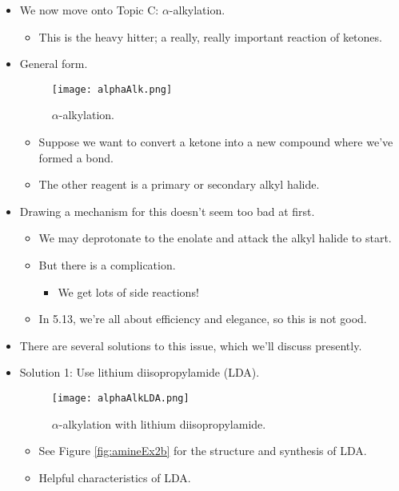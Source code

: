 \documentclass[../notes.tex]{subfiles}
\begin{document}
\begin{itemize}
    \pagebreak
    \item We now move onto Topic C: $\alpha$-alkylation.
    \begin{itemize}
        \item This is the heavy hitter; a really, really important reaction of ketones.
    \end{itemize}
    \item General form.
    \begin{figure}[h!]
        \centering
        \texttt{[image: alphaAlk.png]}
        \caption{$\alpha$-alkylation.}
        \label{fig:alphaAlk}
    \end{figure}
    \begin{itemize}
        \item Suppose we want to convert a ketone into a new compound where we've formed a  bond.
        \item The other reagent is a primary or secondary alkyl halide.
    \end{itemize}
    \item Drawing a mechanism for this doesn't seem too bad at first.
    \begin{itemize}
        \item We may deprotonate to the enolate and attack the alkyl halide to start.
        \item But there is a complication.
        \begin{itemize}
            \item We get lots of side reactions!
        \end{itemize}
        \item In 5.13, we're all about efficiency and elegance, so this is not good.
    \end{itemize}
    \item There are several solutions to this issue, which we'll discuss presently.
    \item Solution 1: Use lithium diisopropylamide (LDA).
    \begin{figure}[h!]
        \centering
        \texttt{[image: alphaAlkLDA.png]}
        \caption{$\alpha$-alkylation with lithium diisopropylamide.}
        \label{fig:alphaAlkLDA}
    \end{figure}
    \begin{itemize}
        \item See Figure \ref{fig:amineEx2b} for the structure and synthesis of LDA.
        \item Helpful characteristics of LDA.

\end{itemize}
\end{itemize}
\end{document}
